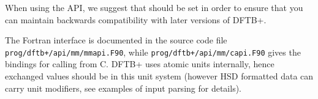 When using the API, we suggest that  should be set in order to
ensure that you can maintain backwards compatibility with later versions of
DFTB+.

The Fortran interface is documented in the source code file
\verb|prog/dftb+/api/mm/mmapi.F90|, while \verb|prog/dftb+/api/mm/capi.F90|
gives the bindings for calling from C. DFTB+ uses atomic units internally, hence
exchanged values should be in this unit system (however HSD formatted data can
carry unit modifiers, see examples of input parsing for details).
